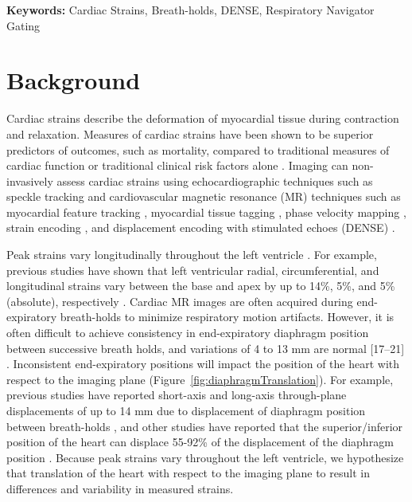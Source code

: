 	\noindent \textbf{Keywords:} Cardiac Strains, Breath-holds, DENSE, Respiratory Navigator Gating
	
\newpage

\section{Background}
	Cardiac strains describe the deformation of myocardial tissue during contraction and relaxation. Measures of cardiac strains have been shown to be superior predictors of outcomes, such as mortality, compared to traditional measures of cardiac function or traditional clinical risk factors alone \cite{Stanton2009}. Imaging can non-invasively assess cardiac strains using echocardiographic techniques such as speckle tracking \cite{Amundsen2006} and cardiovascular magnetic resonance (MR) techniques such as myocardial feature tracking \cite{Hor2010}, myocardial tissue tagging \cite{Axel1989,Zerhouni1988}, phase velocity mapping \cite{Pelc1994}, strain encoding \cite{Osman2001}, and displacement encoding with stimulated echoes (DENSE) \cite{Aletras1999b,Aletras1999c}.

	Peak strains vary longitudinally throughout the left ventricle \cite{Kuijer2002,Moore2000,Young1994a,Feng2009,NasiraeiMoghaddam2010,Donekal2013a,Suever2017}. For example, previous studies have shown that left ventricular radial, circumferential, and longitudinal strains vary between the base and apex by up to 14\%, 5\%, and 5\% (absolute), respectively \cite{Kuijer2002,Moore2000,Young1994a,Feng2009,NasiraeiMoghaddam2010,Donekal2013a,Suever2017}. Cardiac MR images are often acquired during end-expiratory breath-holds to minimize respiratory motion artifacts. However, it is often difficult to achieve consistency in end-expiratory diaphragm position between successive breath holds, and variations of 4 to 13 mm are normal [17–21] \cite{Liu1993,Wang1995a,Taylor1997a,Holland1998c,Fischer2006a}. Inconsistent end-expiratory positions will impact the position of the heart with respect to the imaging plane (Figure~\ref{fig:diaphragmTranslation}). For example, previous studies have reported short-axis and long-axis through-plane displacements of up to 14 mm due to displacement of diaphragm position between breath-holds \cite{Slomka2007,Swingen2003}, and other studies have reported that the superior/inferior position of the heart can displace 55-92\% of the displacement of the diaphragm position \cite{Wang1995b,McLeish2002}. Because peak strains vary throughout the left ventricle, we hypothesize that translation of the heart with respect to the imaging plane to result in differences and variability in measured strains.

